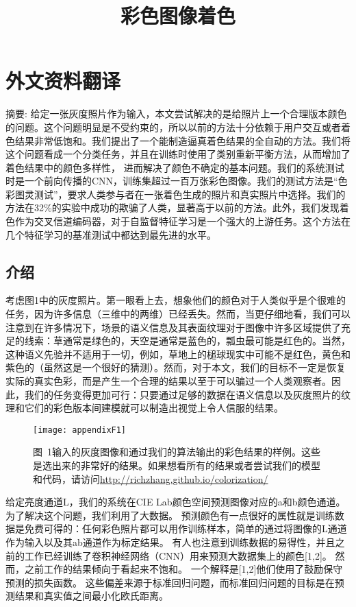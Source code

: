 \chapter{外文资料翻译}
\label{cha:engorg}

\renewcommand\thesection{\arabic {section}}

\title{彩色图像着色}

{\heiti 摘要:} 给定一张灰度照片作为输入，本文尝试解决的是给照片上一个合理版本颜色的问题。这个问题明显是不受约束的，所以以前的方法十分依赖于用户交互或者着色结果非常低饱和。我们提出了一个能制造逼真着色结果的全自动的方法。我们将这个问题看成一个分类任务，并且在训练时使用了类别重新平衡方法，从而增加了着色结果中的颜色多样性， 进而解决了颜色不确定的基本问题。我们的系统测试时是一个前向传播的CNN，训练集超过一百万张彩色图像。我们的测试方法是“色彩图灵测试”，要求人类参与者在一张着色生成的照片和真实照片中选择。我们的方法在32\%的实验中成功的欺骗了人类，显著高于以前的方法。此外，我们发现着色作为交叉信道编码器，对于自监督特征学习是一个强大的上游任务。这个方法在几个特征学习的基准测试中都达到最先进的水平。


\section{介绍}
考虑图1中的灰度照片。第一眼看上去，想象他们的颜色对于人类似乎是个很难的任务，因为许多信息（三维中的两维）已经丢失。然而，当更仔细地看，我们可以注意到在许多情况下，场景的语义信息及其表面纹理对于图像中许多区域提供了充足的线索：草通常是绿色的，天空是通常是蓝色的，瓢虫最可能是红色的。当然，这种语义先验并不适用于一切，例如，草地上的槌球现实中可能不是红色，黄色和紫色的（虽然这是一个很好的猜测）。然而，对于本文，我们的目标不一定是恢复实际的真实色彩，而是产生一个合理的结果以至于可以骗过一个人类观察者。因此，我们的任务变得更加可行：只要通过足够的数据在语义信息以及灰度照片的纹理和它们的彩色版本间建模就可以制造出视觉上令人信服的结果。

\begin{figure}[h]
  \centering
  \texttt{[image: appendixF1]}
  \caption*{图~1\quad 输入的灰度图像和通过我们的算法输出的彩色结果的样例。这些是选出来的非常好的结果。如果想看所有的结果或者尝试我们的模型和代码，请访问\url{http://richzhang.github.io/colorization/}}
  \label{tab:badfigure1}
\end{figure}

给定亮度通道L，我们的系统在CIE Lab颜色空间预测图像对应的a和b颜色通道。为了解决这个问题，我们利用了大数据。 预测颜色有一点很好的属性就是训练数据是免费可得的：任何彩色照片都可以用作训练样本，简单的通过将图像的L通道作为输入以及其ab通道作为标定结果。 有人也注意到训练数据的易得性，并且之前的工作已经训练了卷积神经网络（CNN）用来预测大数据集上的颜色[1,2]。 然而，之前工作的结果倾向于看起来不饱和。 一个解释是[1,2]他们使用了鼓励保守预测的损失函数。 这些偏差来源于标准回归问题，而标准回归问题的目标是在预测结果和真实值之间最小化欧氏距离。

